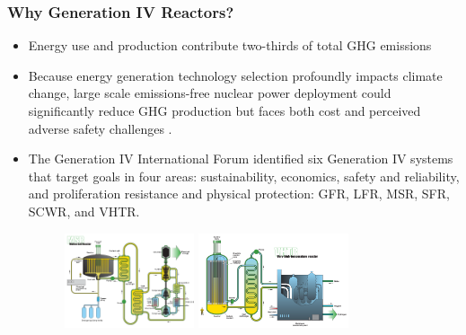 \begin{frame}
    \frametitle{Why Generation IV Reactors?}
    \begin{itemize}
      \item Energy use and production contribute two-thirds of total \gls{GHG} emissions \cite{noauthor_climate_2018}
      \item Because energy generation technology selection profoundly impacts climate change, 
      large scale emissions-free nuclear power deployment could 
      significantly reduce GHG production but faces both cost and perceived adverse 
      safety challenges \cite{noauthor_climate_2018, petti_future_2018}.
      \item The Generation IV International Forum identified six Generation IV systems 
      that target goals in four areas: sustainability, 
      economics, safety and reliability, and proliferation resistance and physical 
      protection: GFR, LFR, MSR, SFR, SCWR, and VHTR. 
      \begin{figure}[htbp!]
          \includegraphics[height=2.8cm]{figures/msr}
          \hspace{1cm}
          \includegraphics[height=2.8cm]{figures/vhtr}
      \end{figure}
    \end{itemize}
  \end{frame}
